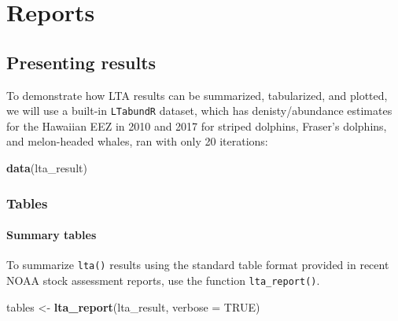 \documentclass[
]{book}
\newenvironment{Shaded}{\begin{snugshade}}{\end{snugshade}}
\newcommand{\DataTypeTok}[1]{\textcolor[rgb]{0.13,0.29,0.53}{#1}}
\newcommand{\DecValTok}[1]{\textcolor[rgb]{0.00,0.00,0.81}{#1}}
\newcommand{\KeywordTok}[1]{\textcolor[rgb]{0.13,0.29,0.53}{\textbf{#1}}}
\newcommand{\NormalTok}[1]{#1}
\newcommand{\OperatorTok}[1]{\textcolor[rgb]{0.81,0.36,0.00}{\textbf{#1}}}
\newcommand{\OtherTok}[1]{\textcolor[rgb]{0.56,0.35,0.01}{#1}}
\newcommand{\StringTok}[1]{\textcolor[rgb]{0.31,0.60,0.02}{#1}}
\begin{document}
\hypertarget{part-reports}{%
\part{Reports}\label{part-reports}}

\hypertarget{presenting-results}{%
\chapter{Presenting results}\label{presenting-results}}

To demonstrate how LTA results can be summarized, tabularized, and plotted, we will use a built-in \texttt{LTabundR} dataset, which has denisty/abundance estimates for the Hawaiian EEZ in 2010 and 2017 for striped dolphins, Fraser's dolphins, and melon-headed whales, ran with only 20 iterations:

\begin{Shaded}
\begin{Highlighting}[]
\KeywordTok{data}\NormalTok{(lta_result)}
\end{Highlighting}
\end{Shaded}

\hypertarget{tables}{%
\section*{Tables}\label{tables}}

\hypertarget{summary-tables}{%
\subsection*{Summary tables}\label{summary-tables}}

To summarize \texttt{lta()} results using the standard table format provided in recent NOAA stock assessment reports, use the function \texttt{lta\_report()}.

\begin{Shaded}
\begin{Highlighting}[]
\NormalTok{tables <-}\StringTok{ }\KeywordTok{lta_report}\NormalTok{(lta_result, }\DataTypeTok{verbose =} \OtherTok{TRUE}\NormalTok{)}
\end{Highlighting}
\end{Shaded}

\begin{Shaded}
\end{Shaded}
\end{document}
